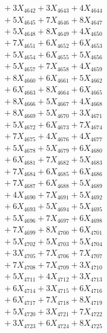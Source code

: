 \documentclass[a4paper,10pt]{article}
\begin{document}
{\begin{align}
&\;  + 3 X_{4642} + 3 X_{4643} + 4 X_{4644} \\[0.3ex]
&\;  + 5 X_{4645} + 7 X_{4646} + 8 X_{4647} \\[0.3ex]
&\;  + 5 X_{4648} + 8 X_{4649} + 4 X_{4650} \\[0.3ex]
&\;  + 7 X_{4651} + 6 X_{4652} + 6 X_{4653} \\[0.3ex]
&\;  + 5 X_{4654} + 6 X_{4655} + 5 X_{4656} \\[0.3ex]
&\;  + 5 X_{4657} + 7 X_{4658} + 4 X_{4659} \\[0.5ex]\allowbreak
&\;  + 8 X_{4660} + 6 X_{4661} + 5 X_{4662} \\[0.3ex]
&\;  + 6 X_{4663} + 8 X_{4664} + 6 X_{4665} \\[0.3ex]
&\;  + 8 X_{4666} + 5 X_{4667} + 4 X_{4668} \\[0.3ex]
&\;  + 8 X_{4669} + 5 X_{4670} + 3 X_{4671} \\[0.3ex]
&\;  + 5 X_{4672} + 6 X_{4673} + 7 X_{4674} \\[0.3ex]
&\;  + 7 X_{4675} + 4 X_{4676} + 4 X_{4677} \\[0.3ex]
&\;  + 5 X_{4678} + 5 X_{4679} + 6 X_{4680} \\[0.3ex]
&\;  + 6 X_{4681} + 7 X_{4682} + 5 X_{4683} \\[0.3ex]
&\;  + 7 X_{4684} + 6 X_{4685} + 6 X_{4686} \\[0.3ex]
&\;  + 7 X_{4687} + 6 X_{4688} + 5 X_{4689} \\[0.5ex]\allowbreak
&\;  + 4 X_{4690} + 7 X_{4691} + 5 X_{4692} \\[0.3ex]
&\;  + 6 X_{4693} + 5 X_{4694} + 5 X_{4695} \\[0.3ex]
&\;  + 5 X_{4696} + 7 X_{4697} + 6 X_{4698} \\[0.3ex]
&\;  + 7 X_{4699} + 8 X_{4700} + 6 X_{4701} \\[0.3ex]
&\;  + 5 X_{4702} + 5 X_{4703} + 5 X_{4704} \\[0.3ex]
&\;  + 3 X_{4705} + 7 X_{4706} + 7 X_{4707} \\[0.3ex]
&\;  + 7 X_{4708} + 7 X_{4709} + 3 X_{4710} \\[0.3ex]
&\;  + 5 X_{4711} + 4 X_{4712} + 3 X_{4713} \\[0.3ex]
&\;  + 6 X_{4714} + 3 X_{4715} + 6 X_{4716} \\[0.3ex]
&\;  + 6 X_{4717} + 7 X_{4718} + 8 X_{4719} \\[0.5ex]\allowbreak
&\;  + 5 X_{4720} + 3 X_{4721} + 7 X_{4722} \\[0.3ex]
&\;  + 3 X_{4723} + 6 X_{4724} + 8 X_{4725} \\[0.3ex]

\end{align}}
\end{document}
